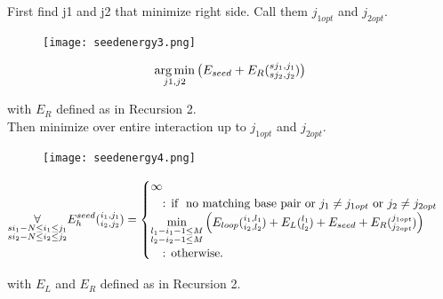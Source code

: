 First find j1 and j2 that minimize right side. Call them $j_{1opt}$ and $j_{2opt}$. 

\begin{figure}[H]
	\centering
	\texttt{[image: seedenergy3.png]}
\end{figure}

\begin{equation*}
\underset{j1, j2}{\arg\min}
\begin{pmatrix}
E_{seed} + E_{R}(\substack{sj_1,j_1\\sj_2,j_2})
\end{pmatrix}\\
\end{equation*}

with $E_{R}$ defined as in Recursion 2.\\
Then minimize over entire interaction up to $j_{1opt}$ and $j_{2opt}$.

\begin{figure}[H]
	\centering
	\texttt{[image: seedenergy4.png]}
\end{figure}

\begin{equation*}
\underset{\substack{si_{1}-N \le i_{1} \le j_{1}\\si_{2}-N \le i_{2} \le j_{2}}}{\forall}\\
E_{h}^{seed}(\substack{i_1, j_1\\i_2, j_2}) = \begin{cases}
\infty\\
\quad\text{: if } \text{ no matching base pair or $j_1 \neq j_{1opt}$ or $j_2 \neq j_{2opt}$ }\\
\min\limits_{\substack{l_{1} - i_{1} - 1 \le M\\l_{2} - i_{2} - 1 \le M}}
\begin{pmatrix}
E_{loop}(\substack{i_1,l_1\\i_2,l_2}) + E_{L}(\substack{l_1\\l_2}) + E_{seed} + E_{R}(\substack{j_{1opt}\\j_{2opt}})
\end{pmatrix}\\
\quad\text{: otherwise.}\\

\end{cases}
\end{equation*}

with $E_{L}$ and $E_{R}$ defined as in Recursion 2.\\

